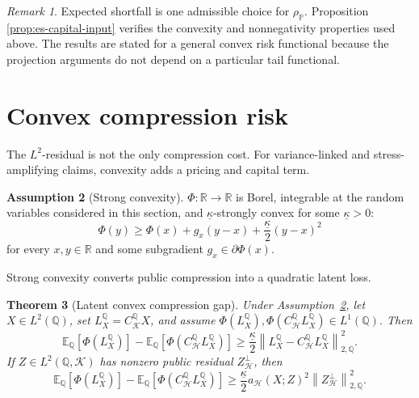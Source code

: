 \documentclass[11pt,a4paper]{amsart}
\theoremstyle{plain}
\newtheorem{theorem}{Theorem}[section]
\theoremstyle{definition}
\newtheorem{assumption}[theorem]{Assumption}
\theoremstyle{remark}
\newtheorem{remark}[theorem]{Remark}
\newcommand{\R}{\mathbb{R}}
\newcommand{\PP}{\mathbb{P}}
\newcommand{\QQ}{\mathbb{Q}}
\newcommand{\EE}{\mathbb{E}}
\newcommand{\cH}{\mathcal{H}}
\newcommand{\cK}{\mathcal{K}}
\newcommand{\norm}[1]{\left\lVert #1\right\rVert}
\begin{document}
\begin{remark}
Expected shortfall is one admissible choice for \(\rho_\PP\).  Proposition
\ref{prop:es-capital-input} verifies the convexity and nonnegativity properties used above.  The
results are stated for a general convex risk functional because the projection arguments do not
depend on a particular tail functional.
\end{remark}

\section{Convex compression risk}\label{sec:convex}

The \(L^2\)-residual is not the only compression cost.  For variance-linked and stress-amplifying
claims, convexity adds a pricing and capital term.

\begin{assumption}[Strong convexity]\label{ass:strong-convex}
\(\Phi:\R\to\R\) is Borel, integrable at the random variables considered in this section, and
\(\underline\kappa\)-strongly convex for some \(\underline\kappa>0\):
\[
        \Phi(y)
        \ge
        \Phi(x)+g_x(y-x)+\frac{\underline\kappa}{2}(y-x)^2
\]
for every \(x,y\in\R\) and some subgradient \(g_x\in\partial\Phi(x)\).
\end{assumption}

Strong convexity converts public compression into a quadratic latent loss.

\begin{theorem}[Latent convex compression gap]\label{thm:latent-convex-gap}
Under Assumption~\ref{ass:strong-convex}, let \(X\in L^2(\QQ)\), set
\(L_X^\QQ=C_{\cK}^{\QQ}X\), and assume
\(\Phi(L_X^\QQ),\Phi(C_{\cH}^{\QQ}L_X^\QQ)\in L^1(\QQ)\).  Then
\[
        \EE_\QQ[\Phi(L_X^\QQ)]
        -
        \EE_\QQ[\Phi(C_{\cH}^{\QQ}L_X^\QQ)]
        \ge
        \frac{\underline\kappa}{2}
        \norm{L_X^\QQ-C_{\cH}^{\QQ}L_X^\QQ}_{2,\QQ}^{2}.
\]
If \(Z\in L^2(\QQ,\cK)\) has nonzero public residual \(Z_{\cH}^{\perp}\), then
\[
        \EE_\QQ[\Phi(L_X^\QQ)]
        -
        \EE_\QQ[\Phi(C_{\cH}^{\QQ}L_X^\QQ)]
        \ge
        \frac{\underline\kappa}{2}
        a_{\cH}(X;Z)^2
        \norm{Z_{\cH}^{\perp}}_{2,\QQ}^{2}.
\]
\end{theorem}
\end{document}
